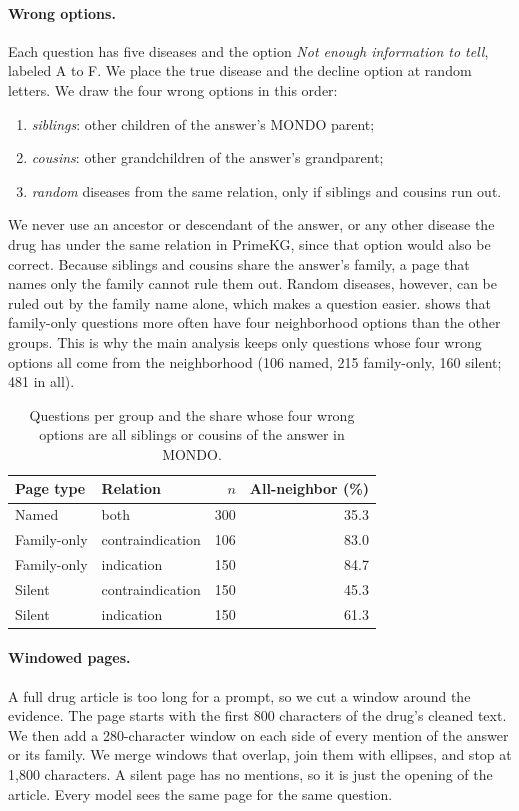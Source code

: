 \paragraph{Wrong options.}
Each question has five diseases and the option \emph{Not enough information to tell}, labeled A to F. We place the true disease and the decline option at random letters. We draw the four wrong options in this order:
\begin{enumerate}
\item \emph{siblings}: other children of the answer's MONDO parent;
\item \emph{cousins}: other grandchildren of the answer's grandparent;
\item \emph{random} diseases from the same relation, only if siblings and cousins run out.
\end{enumerate}
We never use an ancestor or descendant of the answer, or any other disease the drug has under the same relation in PrimeKG, since that option would also be correct. Because siblings and cousins share the answer's family, a page that names only the family cannot rule them out. Random diseases, however, can be ruled out by the family name alone, which makes a question easier.  shows that family-only questions more often have four neighborhood options than the other groups. This is why the main analysis keeps only questions whose four wrong options all come from the neighborhood (106 named, 215 family-only, 160 silent; 481 in all).

\begin{table}[t]
\centering
\footnotesize
\setlength{\tabcolsep}{4pt}
\begin{tabular}{@{}llrr@{}}
\toprule
Page type & Relation & $n$ & All-neighbor (\%) \\
\midrule
Named & both & 300 & 35.3 \\
Family-only & contraindication & 106 & 83.0 \\
Family-only & indication & 150 & 84.7 \\
Silent & contraindication & 150 & 45.3 \\
Silent & indication & 150 & 61.3 \\
\bottomrule
\end{tabular}
\caption{Questions per group and the share whose four wrong options are all siblings or cousins of the answer in MONDO.}
\label{tab:sib}
\end{table}

\paragraph{Windowed pages.}
A full drug article is too long for a prompt, so we cut a window around the evidence. The page starts with the first 800 characters of the drug's cleaned text. We then add a 280-character window on each side of every mention of the answer or its family. We merge windows that overlap, join them with ellipses, and stop at 1,800 characters. A silent page has no mentions, so it is just the opening of the article. Every model sees the same page for the same question.

